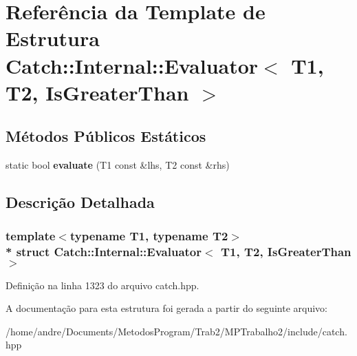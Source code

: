 \hypertarget{structCatch_1_1Internal_1_1Evaluator_3_01T1_00_01T2_00_01IsGreaterThan_01_4}{}\section{Referência da Template de Estrutura Catch\+:\+:Internal\+:\+:Evaluator$<$ T1, T2, Is\+Greater\+Than $>$}
\label{structCatch_1_1Internal_1_1Evaluator_3_01T1_00_01T2_00_01IsGreaterThan_01_4}
\subsection*{Métodos Públicos Estáticos}
\begin{DoxyCompactItemize}
\item 
static bool {\bfseries evaluate} (T1 const \&lhs, T2 const \&rhs)\hypertarget{structCatch_1_1Internal_1_1Evaluator_3_01T1_00_01T2_00_01IsGreaterThan_01_4_a55745f74f09ac5c61bd3d592ca5560af}{}\label{structCatch_1_1Internal_1_1Evaluator_3_01T1_00_01T2_00_01IsGreaterThan_01_4_a55745f74f09ac5c61bd3d592ca5560af}

\end{DoxyCompactItemize}


\subsection{Descrição Detalhada}
\subsubsection*{template$<$typename T1, typename T2$>$\\*
struct Catch\+::\+Internal\+::\+Evaluator$<$ T1, T2, Is\+Greater\+Than $>$}



Definição na linha 1323 do arquivo catch.\+hpp.



A documentação para esta estrutura foi gerada a partir do seguinte arquivo\+:\begin{DoxyCompactItemize}
\item 
/home/andre/\+Documents/\+Metodos\+Program/\+Trab2/\+M\+P\+Trabalho2/include/catch.\+hpp\end{DoxyCompactItemize}
